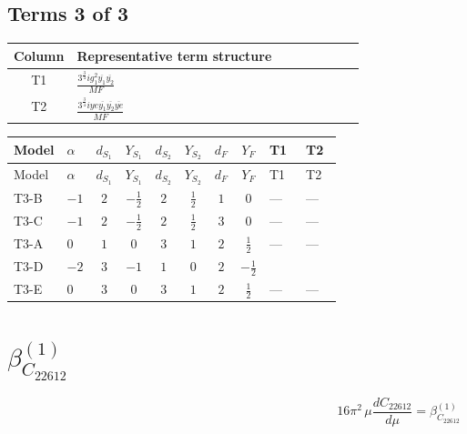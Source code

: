 \documentclass[8pt]{article}
\begin{document}
\begin{landscape}
\subsection*{Terms 3 of 3}
\begin{center}
\begin{tabular}{@{}c >{\raggedright\arraybackslash}p{0.82\linewidth}@{}}
\toprule
Column & Representative term structure \\
\midrule
T1 & \(\displaystyle \frac{3^{\frac{3}{4}} i g_{1}^{2} \overline{y_{1}} \overline{y_{2}}}{MF}\) \\
\midrule
T2 & \(\displaystyle \frac{3^{\frac{3}{4}} i ye \overline{y_{1}} \overline{y_{2}} \overline{ye}}{MF}\) \\
\midrule
\bottomrule
\end{tabular}
\end{center}
\smallskip
\tiny
\begin{longtable}{@{}llcccccc >{\raggedright\arraybackslash}p{0.21\linewidth} >{\raggedright\arraybackslash}p{0.21\linewidth}@{}}
\toprule
Model & $\alpha$ & $d_{S_1}$ & $Y_{S_1}$ & $d_{S_2}$ & $Y_{S_2}$ & $d_F$ & $Y_F$ & T1 & T2 \\
\midrule
\endfirsthead
\toprule
Model & $\alpha$ & $d_{S_1}$ & $Y_{S_1}$ & $d_{S_2}$ & $Y_{S_2}$ & $d_F$ & $Y_F$ & T1 & T2 \\
\midrule
\endhead
T3-B & $-1$ & $2$ & $-\frac{1}{2}$ & $2$ & $\frac{1}{2}$ & $1$ & $0$ & --- & --- \\
\midrule
T3-C & $-1$ & $2$ & $-\frac{1}{2}$ & $2$ & $\frac{1}{2}$ & $3$ & $0$ & --- & --- \\
\midrule
T3-A & $0$ & $1$ & $0$ & $3$ & $1$ & $2$ & $\frac{1}{2}$ & --- & --- \\
\midrule
T3-D & $-2$ & $3$ & $-1$ & $1$ & $0$ & $2$ & $-\frac{1}{2}$ & \scriptsize\adjustbox{max width=\linewidth}{$\begin{gathered} - \frac{3^{\frac{3}{4}} i g_{1}^{2} \overline{y_{1}} \overline{y_{2}}}{8 MF}\end{gathered}$} & \scriptsize\adjustbox{max width=\linewidth}{$\begin{gathered} \frac{3^{\frac{3}{4}} i ye \overline{y_{1}} \overline{y_{2}} \overline{ye}}{12 MF}\end{gathered}$} \\
\midrule
T3-E & $0$ & $3$ & $0$ & $3$ & $1$ & $2$ & $\frac{1}{2}$ & --- & --- \\
\midrule
\bottomrule
\end{longtable}
\clearpage
\section*{$\beta_{C_{22612}}^{(1)}$}
\[16\pi^2\,\mu\frac{d C_{22612}}{d\mu}=\beta_{C_{22612}}^{(1)}\]

\end{landscape}
\end{document}
